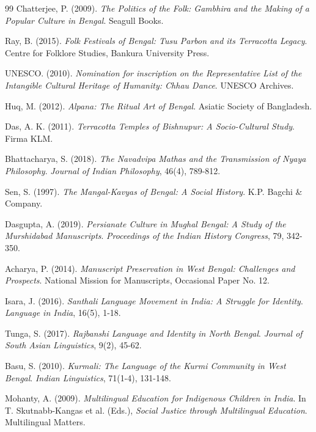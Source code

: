\documentclass{article}
\begin{document}
\begin{thebibliography}{99}
 Chatterjee, P. (2009). \textit{The Politics of the Folk: Gambhira and the Making of a Popular Culture in Bengal}. Seagull Books.

 Ray, B. (2015). \textit{Folk Festivals of Bengal: Tusu Parbon and its Terracotta Legacy}. Centre for Folklore Studies, Bankura University Press.

 UNESCO. (2010). \textit{Nomination for inscription on the Representative List of the Intangible Cultural Heritage of Humanity: Chhau Dance}. UNESCO Archives.

 Huq, M. (2012). \textit{Alpana: The Ritual Art of Bengal}. Asiatic Society of Bangladesh.

 Das, A. K. (2011). \textit{Terracotta Temples of Bishnupur: A Socio-Cultural Study}. Firma KLM.

 Bhattacharya, S. (2018). \textit{The Navadvipa Mathas and the Transmission of Nyaya Philosophy}. \textit{Journal of Indian Philosophy}, 46(4), 789-812.

 Sen, S. (1997). \textit{The Mangal-Kavyas of Bengal: A Social History}. K.P. Bagchi & Company.

 Dasgupta, A. (2019). \textit{Persianate Culture in Mughal Bengal: A Study of the Murshidabad Manuscripts}. \textit{Proceedings of the Indian History Congress}, 79, 342-350.

 Acharya, P. (2014). \textit{Manuscript Preservation in West Bengal: Challenges and Prospects}. National Mission for Manuscripts, Occasional Paper No. 12.

 Isara, J. (2016). \textit{Santhali Language Movement in India: A Struggle for Identity}. \textit{Language in India}, 16(5), 1-18.

 Tunga, S. (2017). \textit{Rajbanshi Language and Identity in North Bengal}. \textit{Journal of South Asian Linguistics}, 9(2), 45-62.

 Basu, S. (2010). \textit{Kurmali: The Language of the Kurmi Community in West Bengal}. \textit{Indian Linguistics}, 71(1-4), 131-148.

 Mohanty, A. (2009). \textit{Multilingual Education for Indigenous Children in India}. In T. Skutnabb-Kangas et al. (Eds.), \textit{Social Justice through Multilingual Education}. Multilingual Matters.

\end{thebibliography}
\end{document}
